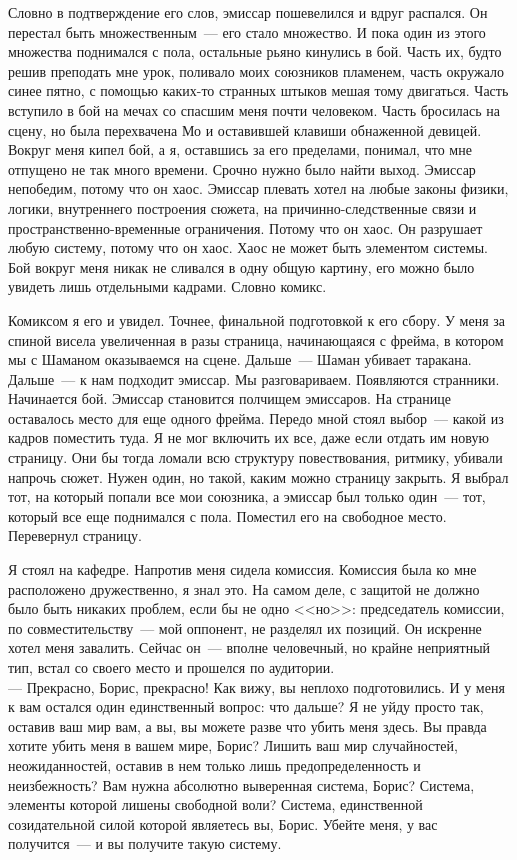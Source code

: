 Словно в подтверждение его слов, эмиссар пошевелился и вдруг распался. Он 
перестал быть множественным~--- его стало множество. И пока один из этого 
множества поднимался с пола, остальные рьяно кинулись в бой. Часть их, будто 
решив преподать мне урок, поливало моих союзников пламенем, часть окружало 
синее пятно, с помощью каких-то странных штыков мешая тому двигаться. Часть вступило 
в бой на мечах со спасшим меня почти человеком. Часть бросилась на сцену, но была 
перехвачена Мо и оставившей клавиши обнаженной девицей. Вокруг меня кипел бой, 
а я, оставшись за его пределами, понимал, что мне отпущено не так много времени. 
Срочно нужно было найти выход. Эмиссар непобедим, потому что он хаос. Эмиссар 
плевать хотел на любые законы физики, логики, внутреннего построения сюжета, на 
причинно-следственные связи и пространственно-временные ограничения. Потому что 
он хаос. Он разрушает любую систему, потому что он хаос. Хаос не может быть 
элементом системы. Бой вокруг меня никак не сливался в одну общую картину, его 
можно было увидеть лишь отдельными кадрами. Словно комикс.

Комиксом я его и увидел. Точнее, финальной подготовкой к его сбору. У меня за 
спиной висела увеличенная в разы страница, начинающаяся с фрейма, в котором мы 
с Шаманом оказываемся на сцене. Дальше~--- Шаман убивает таракана. Дальше~--- к 
нам подходит эмиссар. Мы разговариваем. Появляются странники. Начинается бой. 
Эмиссар становится полчищем эмиссаров. На странице оставалось место для еще 
одного фрейма. Передо мной стоял выбор~--- какой из кадров поместить туда. Я не 
мог включить их все, даже если отдать им новую страницу. Они бы тогда ломали 
всю структуру повествования, ритмику, убивали напрочь сюжет. Нужен один, но такой, 
каким можно страницу закрыть. Я выбрал тот, на который попали все мои союзника, 
а эмиссар был только один~--- тот, который все еще поднимался с пола. Поместил 
его на свободное место. Перевернул страницу.

Я стоял на кафедре. Напротив меня сидела комиссия. Комиссия была ко мне 
расположено дружественно, я знал это. На самом деле, с защитой не должно было 
быть никаких проблем, если бы не одно <<но>>: председатель комиссии, по 
совместительству~--- мой оппонент, не разделял их позиций. Он искренне хотел 
меня завалить. Сейчас он~--- вполне человечный, но крайне неприятный тип, встал со 
своего место и прошелся по аудитории.\\
--- Прекрасно, Борис, прекрасно! Как вижу, вы неплохо подготовились. И у меня к 
вам остался один единственный вопрос: что дальше? Я не уйду просто так, оставив 
ваш мир вам, а вы, вы можете разве что убить меня здесь. Вы правда хотите убить 
меня в вашем мире, Борис? Лишить ваш мир случайностей, неожиданностей, оставив 
в нем только лишь предопределенность и неизбежность? Вам нужна абсолютно 
выверенная система, Борис? Система, элементы которой лишены свободной воли? 
Система, единственной созидательной силой которой являетесь вы, Борис. Убейте 
меня, у вас получится~--- и вы получите такую систему.


